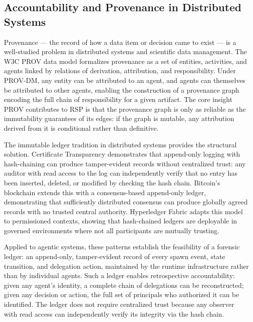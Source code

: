 \documentclass[12pt]{article}
\begin{document}
\subsection{Accountability and Provenance in Distributed Systems}

Provenance --- the record of how a data item or decision came to exist --- is a well-studied problem in distributed systems and scientific data management. The W3C PROV data model \cite{moreau2015-prov} formalizes provenance as a set of entities, activities, and agents linked by relations of derivation, attribution, and responsibility. Under PROV-DM, any entity can be attributed to an agent, and agents can themselves be attributed to other agents, enabling the construction of a provenance graph encoding the full chain of responsibility for a given artifact. The core insight PROV contributes to RSP is that the provenance graph is only as reliable as the immutability guarantees of its edges: if the graph is mutable, any attribution derived from it is conditional rather than definitive.

The immutable ledger tradition in distributed systems provides the structural solution. Certificate Transparency \cite{laurie2013certificate} demonstrates that append-only logging with hash-chaining can produce tamper-evident records without centralized trust: any auditor with read access to the log can independently verify that no entry has been inserted, deleted, or modified by checking the hash chain. Bitcoin's blockchain \cite{nakamoto2008bitcoin} extends this with a consensus-based append-only ledger, demonstrating that sufficiently distributed consensus can produce globally agreed records with no trusted central authority. Hyperledger Fabric \cite{hyperledger2015} adapts this model to permissioned contexts, showing that hash-chained ledgers are deployable in governed environments where not all participants are mutually trusting.

Applied to agentic systems, these patterns establish the feasibility of a forensic ledger: an append-only, tamper-evident record of every spawn event, state transition, and delegation action, maintained by the runtime infrastructure rather than by individual agents. Such a ledger enables retrospective accountability: given any agent's identity, a complete chain of delegations can be reconstructed; given any decision or action, the full set of principals who authorized it can be identified. The ledger does not require centralized trust because any observer with read access can independently verify its integrity via the hash chain.
\end{document}

